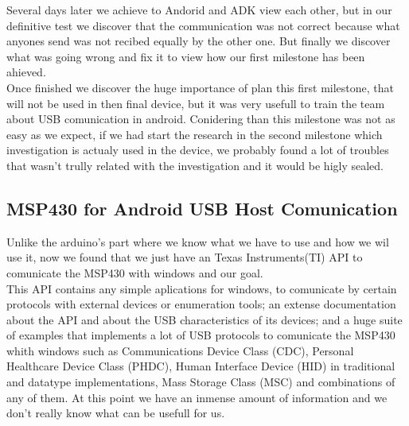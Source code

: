 		Several days later we achieve to Andorid and ADK view each other, but in our definitive test we discover that the communication was not correct because what anyones send was not recibed equally by the other one. But finally we discover what was going wrong and fix it to view how our first milestone has been ahieved.\\

		Once finished we discover the huge importance of plan this first milestone, that will not be used in then final device, but it was very usefull to train the team about USB comunication in android. Conidering than this milestone was not as easy as we expect, if we had start the research in the second milestone which investigation is actualy used in the device, we probably found a lot of troubles that wasn't trully related with the investigation and it would be higly sealed.\\


		\subsection{MSP430 for Android USB Host Comunication}


		Unlike the arduino's part where we know what we have to use and how we wil use it, now we found that we just have an Texas Instruments(TI) API to comunicate the MSP430 with windows and our goal.\\

		This API contains any simple aplications for windows, to comunicate by certain protocols with external devices or enumeration tools; an extense documentation about the API and about the USB characteristics of its devices; and a huge suite of examples that implements a lot of USB protocols to comunicate the MSP430 whith windows such as Communications Device Class (CDC), Personal Healthcare Device Class (PHDC), Human Interface Device (HID) in traditional and datatype implementations, Mass Storage Class (MSC) and combinations of any of them. At this point we have an inmense amount of information and we don't really know what can be usefull for us.\\

